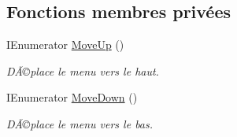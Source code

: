 \subsection*{Fonctions membres privées}
\begin{DoxyCompactItemize}
\item 
I\+Enumerator \mbox{\hyperlink{class_menu_visualization_u_i_a78a78af22e7a9248292601026c8429cb}{Move\+Up}} ()
\begin{DoxyCompactList}\small\item\em DÃ©place le menu vers le haut. \end{DoxyCompactList}\item 
I\+Enumerator \mbox{\hyperlink{class_menu_visualization_u_i_a65d11fcd4e858cf3bb0c4fdc95128030}{Move\+Down}} ()
\begin{DoxyCompactList}\small\item\em DÃ©place le menu vers le bas. \end{DoxyCompactList}\end{DoxyCompactItemize}
